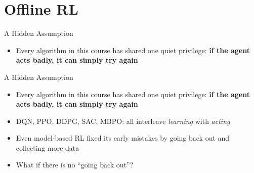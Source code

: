 \section{Offline RL}

\begin{frame}{A Hidden Assumption}
\begin{itemize}
    \item Every algorithm in this course has shared one quiet privilege:
          \textbf{if the agent acts badly, it can simply try again}
\end{itemize}
\end{frame}

\begin{frame}{A Hidden Assumption}
\begin{itemize}
    \item Every algorithm in this course has shared one quiet privilege:
          \textbf{if the agent acts badly, it can simply try again}
    \item DQN, PPO, DDPG, SAC, MBPO: all interleave \emph{learning} with
          \emph{acting}
    \item Even model-based RL fixed its early mistakes by going back out and
          collecting more data
    \item What if there is no ``going back out''?
\end{itemize}
\end{frame}


